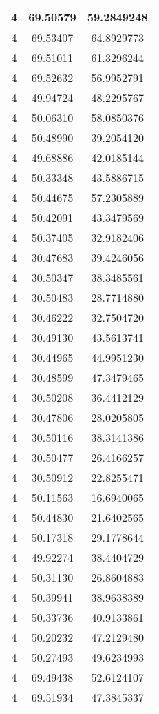 \documentclass[
]{book}
\begin{document}
\begin{tabular}{c|c|c}
\hline
4 & 69.50579 & 59.2849248\\
\hline
4 & 69.53407 & 64.8929773\\
\hline
4 & 69.51011 & 61.3296244\\
\hline
4 & 69.52632 & 56.9952791\\
\hline
4 & 49.94724 & 48.2295767\\
\hline
4 & 50.06310 & 58.0850376\\
\hline
4 & 50.48990 & 39.2054120\\
\hline
4 & 49.68886 & 42.0185144\\
\hline
4 & 50.33348 & 43.5886715\\
\hline
4 & 50.44675 & 57.2305889\\
\hline
4 & 50.42091 & 43.3479569\\
\hline
4 & 50.37405 & 32.9182406\\
\hline
4 & 30.47683 & 39.4246056\\
\hline
4 & 30.50347 & 38.3485561\\
\hline
4 & 30.50483 & 28.7714880\\
\hline
4 & 30.46222 & 32.7504720\\
\hline
4 & 30.49130 & 43.5613741\\
\hline
4 & 30.44965 & 44.9951230\\
\hline
4 & 30.48599 & 47.3479465\\
\hline
4 & 30.50208 & 36.4412129\\
\hline
4 & 30.47806 & 28.0205805\\
\hline
4 & 30.50116 & 38.3141386\\
\hline
4 & 30.50477 & 26.4166257\\
\hline
4 & 30.50912 & 22.8255471\\
\hline
4 & 50.11563 & 16.6940065\\
\hline
4 & 50.44830 & 21.6402565\\
\hline
4 & 50.17318 & 29.1778644\\
\hline
4 & 49.92274 & 38.4404729\\
\hline
4 & 50.31130 & 26.8604883\\
\hline
4 & 50.39941 & 38.9638389\\
\hline
4 & 50.33736 & 40.9133861\\
\hline
4 & 50.20232 & 47.2129480\\
\hline
4 & 50.27493 & 49.6234993\\
\hline
4 & 69.49438 & 52.6124107\\
\hline
4 & 69.51934 & 47.3845337\\

\end{tabular}
\end{document}
